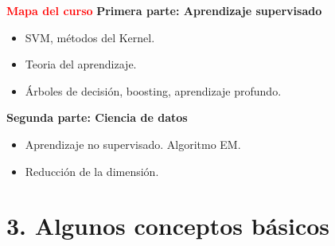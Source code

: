 \documentclass[11pt]{beamer}
\begin{document}
\begin{frame}{\textbf{\textcolor{red}{Mapa del curso}}}
	\textbf{Primera parte: Aprendizaje supervisado}
	
	\begin{itemize}
		\item SVM, m\'etodos del Kernel.
		\item Teoria del aprendizaje.
		\item \'Arboles de decisi\'on, boosting, aprendizaje profundo.
	\end{itemize}
	\textbf{Segunda parte: Ciencia de datos}
	\begin{itemize}
		\item Aprendizaje no supervisado. Algoritmo EM.
		\item Reducci\'on de la dimensi\'on.
	\end{itemize}
\end{frame}

\section{3. Algunos conceptos b\'asicos }
\end{document}
